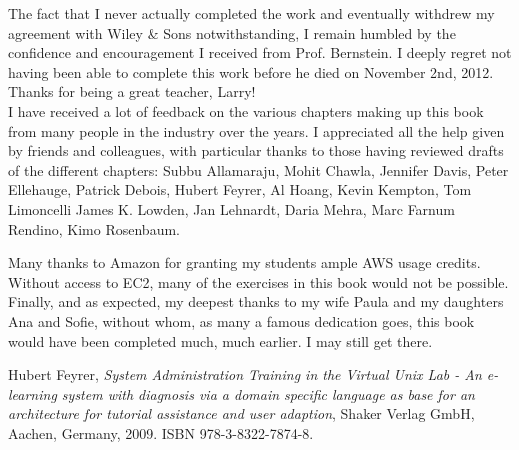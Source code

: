 The fact that I never actually completed the work and
eventually withdrew my agreement with Wiley \& Sons
notwithstanding, I remain humbled by the confidence
and encouragement I received from Prof. Bernstein.  I
deeply regret not having been able to complete this
work before he died on November 2nd, 2012.  Thanks for
being a great teacher, Larry!
\\

I have received a lot of feedback on the various
chapters making up this book from many people in the
industry over the years.  I appreciated all the help
given by friends and colleagues, with particular
thanks to those having reviewed drafts of the
different chapters:
Subbu Allamaraju,
Mohit Chawla,
Jennifer Davis,
Peter Ellehauge,
Patrick Debois,
Hubert Feyrer,
Al Hoang,
Kevin Kempton,
Tom Limoncelli
James K. Lowden,
Jan Lehnardt,
Daria Mehra,
Marc Farnum Rendino,
Kimo Rosenbaum.

Many thanks to Amazon for granting my students ample
AWS usage credits.  Without access to EC2, many of the
exercises in this book would not be possible.
\\

Finally, and as expected, my deepest thanks to my wife
Paula and my daughters Ana and Sofie, without whom, as
many a famous dedication goes, this book would have
been completed much, much earlier.  I may still get
there.


\pagebreak

\begin{thebibliography}{99}

Hubert Feyrer, {\em System Administration Training in
the Virtual Unix Lab - An e-learning system with diagnosis via a domain
specific language as base for an architecture for tutorial assistance and
user adaption}, Shaker Verlag GmbH, Aachen, Germany, 2009. ISBN
978-3-8322-7874-8.


\end{thebibliography}

